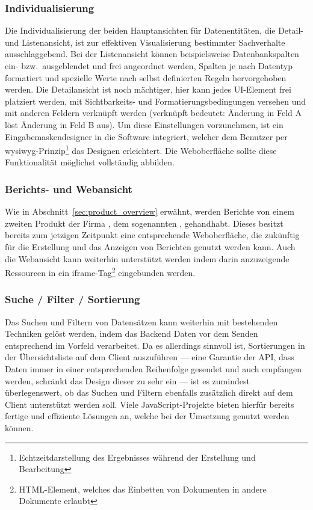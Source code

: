 \subsubsection{Individualisierung}
Die Individualisierung der beiden Hauptansichten für Datenentitäten, die Detail- und Listenansicht, ist zur effektiven Visualisierung bestimmter Sachverhalte ausschlaggebend. Bei der Listenansicht können beispielsweise Datenbankspalten ein- bzw.\ ausgeblendet und frei angeordnet werden, Spalten je nach Datentyp formatiert und spezielle Werte nach selbst definierten Regeln hervorgehoben werden. Die Detailansicht ist noch mächtiger, hier kann jedes UI-Element frei platziert werden, mit Sichtbarkeits- und Formatierungsbedingungen versehen und mit anderen Feldern verknüpft werden (verknüpft bedeutet: Änderung in Feld A löst Änderung in Feld B aus). Um diese Einstellungen vorzunehmen, ist ein Eingabemaskendesigner in die Software integriert, welcher dem Benutzer per \gls{wysiwyg}-Prinzip\footnote{Echtzeitdarstellung des Ergebnisses während der Erstellung und Bearbeitung} das Designen erleichtert.
Die Weboberfläche sollte diese Funktionalität möglichst vollständig abbilden.

\subsubsection{Berichts- und Webansicht}
Wie in Abschnitt~\ref{sec:product_overview} erwähnt, werden Berichte von einem zweiten Produkt der Firma , dem sogenannten , gehandhabt. Dieses besitzt bereits zum jetzigen Zeitpunkt eine entsprechende Weboberfläche, die zukünftig für die Erstellung und das Anzeigen von Berichten genutzt werden kann. 
Auch die Webansicht kann weiterhin unterstützt werden indem darin anzuzeigende Ressourcen in ein iframe-Tag\footnote{HTML-Element, welches das Einbetten von Dokumenten in andere Dokumente erlaubt} eingebunden werden.

\subsubsection{Suche / Filter / Sortierung}
Das Suchen und Filtern von Datensätzen kann weiterhin mit bestehenden Techniken gelöst werden, indem das Backend Daten vor dem Senden entsprechend im Vorfeld verarbeitet. Da es allerdings sinnvoll ist, Sortierungen in der Übersichtsliste auf dem Client auszuführen --- eine Garantie der API, dass Daten immer in einer entsprechenden Reihenfolge gesendet und auch empfangen werden, schränkt das Design dieser zu sehr ein --- ist es zumindest überlegenswert, ob das Suchen und Filtern ebenfalls zusätzlich direkt auf dem Client unterstützt werden soll. Viele JavaScript-Projekte bieten hierfür bereits fertige und effiziente Lösungen an, welche bei der Umsetzung genutzt werden können.

